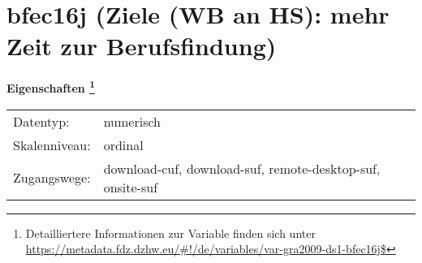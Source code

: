 
    \setcounter{footnote}{0}

    \vspace*{-1.8cm}
	\section{bfec16j (Ziele (WB an HS): mehr Zeit zur Berufsfindung)}
	\label{section:bfec16j}



    \vspace*{0.5cm}
    \noindent\textbf{Eigenschaften
	\footnote{Detailliertere Informationen zur Variable finden sich unter
		\url{https://metadata.fdz.dzhw.eu/\#!/de/variables/var-gra2009-ds1-bfec16j$}}}\\
	\begin{tabularx}{\hsize}{@{}lX}
	Datentyp: & numerisch \\
	Skalenniveau: & ordinal \\
	Zugangswege: &
	  download-cuf, 
	  download-suf, 
	  remote-desktop-suf, 
	  onsite-suf
 \\
    \end{tabularx}



